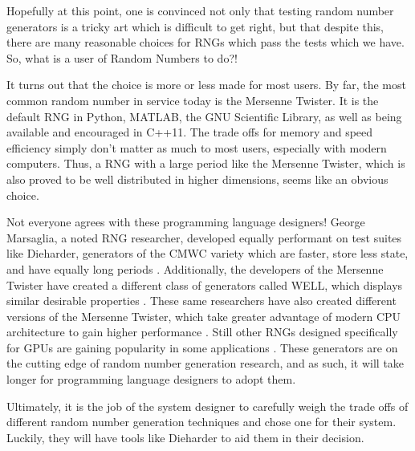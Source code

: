 Hopefully at this point, one is convinced not only that testing random number generators is a tricky art which is difficult to get right, but that despite this, there are many reasonable choices for RNGs which pass the tests which we have. So, what is a user of Random Numbers to do?!

It turns out that the choice is more or less made for most users. By far, the most common random number in service today is the Mersenne Twister. It is the default RNG in Python, MATLAB, the GNU Scientific Library, as well as being available and encouraged in C++11. The trade offs for memory and speed efficiency simply don't matter as much to most users, especially with modern computers. Thus, a RNG with a large period like the Mersenne Twister, which is also proved to be well distributed in higher dimensions, seems like an obvious choice.

Not everyone agrees with these programming language designers! George Marsaglia, a noted RNG researcher, developed equally performant on test suites like Dieharder, generators of the CMWC variety which are faster, store less state, and have equally long periods \cite{Marsaglia:2003:SRN:769800.769827}. Additionally, the developers of the Mersenne Twister have created a different class of generators called WELL, which displays similar desirable properties \cite{Panneton:2006:ILG:1132973.1132974}. These same researchers have also created different versions of the Mersenne Twister, which take greater advantage of modern CPU architecture to gain higher performance \cite{sfmt}. Still other RNGs designed specifically for GPUs are gaining popularity in some applications \cite{Passerat-Palmbach:2011:PNG:2060104.2060643,Zafar:2010:GRN:1921479.1921500}. These generators are on the cutting edge of random number generation research, and as such, it will take longer for programming language designers to adopt them.

Ultimately, it is the job of the system designer to carefully weigh the trade offs of different random number generation techniques and chose one for their system. Luckily, they will have tools like Dieharder to aid them in their decision.

